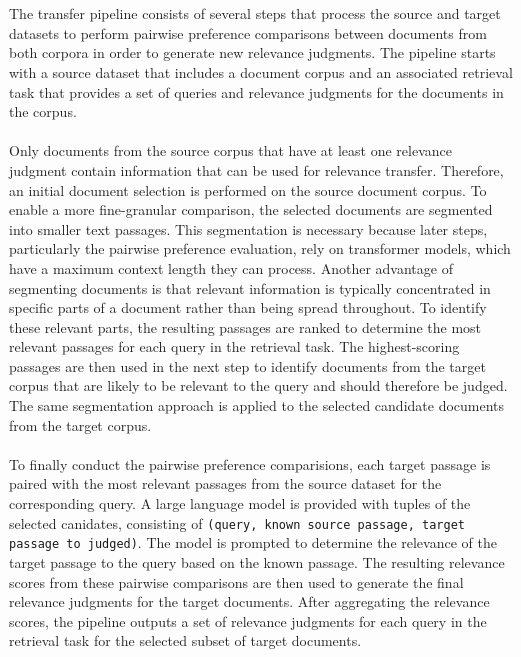 \\\\
The transfer pipeline consists of several steps that process the source and target datasets to perform pairwise preference comparisons between documents from both corpora in order to generate new relevance judgments. The pipeline starts with a source dataset that includes a document corpus and an associated retrieval task that provides a set of queries and relevance judgments for the documents in the corpus.
\\\\
Only documents from the source corpus that have at least one relevance judgment contain information that can be used for relevance transfer. Therefore, an initial document selection is performed on the source document corpus. To enable a more fine-granular comparison, the selected documents are segmented into smaller text passages. This segmentation is necessary because later steps, particularly the pairwise preference evaluation, rely on transformer models, which have a maximum context length they can process. Another advantage of segmenting documents is that relevant information is typically concentrated in specific parts of a document rather than being spread throughout. To identify these relevant parts, the resulting passages are ranked to determine the most relevant passages for each query in the retrieval task. The highest-scoring passages are then used in the next step to identify documents from the target corpus that are likely to be relevant to the query and should therefore be judged. The same segmentation approach is applied to the selected candidate documents from the target corpus.
\\\\
To finally conduct the pairwise preference comparisions, each target passage is paired with the most relevant passages from the source dataset for the corresponding query. A large language model is provided with tuples of the selected canidates, consisting of \texttt{(query, known source passage, target passage to judged)}. The model is prompted to determine the relevance of the target passage to the query based on the known passage. The resulting relevance scores from these pairwise comparisons are then used to generate the final relevance judgments for the target documents. After aggregating the relevance scores, the pipeline outputs a set of relevance judgments for each query in the retrieval task for the selected subset of target documents.
\\\\
